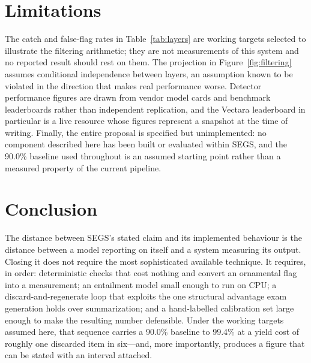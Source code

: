 \documentclass[stu,11pt,floatsintext]{apa7}
\begin{document}
\section{Limitations}

The catch and false-flag rates in Table~\ref{tab:layers} are working targets
selected to illustrate the filtering arithmetic; they are not measurements of
this system and no reported result should rest on them. The projection in
Figure~\ref{fig:filtering} assumes conditional independence between layers, an
assumption known to be violated in the direction that makes real performance
worse. Detector performance figures are drawn from vendor model cards and
benchmark leaderboards rather than independent replication, and the Vectara
leaderboard in particular is a live resource whose figures represent a snapshot
at the time of writing. Finally, the entire proposal is specified but
unimplemented: no component described here has been built or evaluated within
SEGS, and the 90.0\% baseline used throughout is an assumed starting point
rather than a measured property of the current pipeline.

\section{Conclusion}

The distance between SEGS's stated claim and its implemented behaviour is the
distance between a model reporting on itself and a system measuring its output.
Closing it does not require the most sophisticated available technique. It
requires, in order: deterministic checks that cost nothing and convert an
ornamental flag into a measurement; an entailment model small enough to run on
CPU; a discard-and-regenerate loop that exploits the one structural advantage
exam generation holds over summarization; and a hand-labelled calibration set
large enough to make the resulting number defensible. Under the working targets
assumed here, that sequence carries a 90.0\% baseline to 99.4\% at a yield cost
of roughly one discarded item in six---and, more importantly, produces a figure
that can be stated with an interval attached.

\printbibliography
\end{document}
